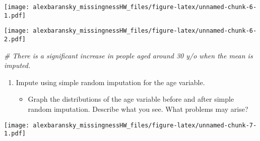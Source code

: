 \documentclass[]{article}
\newenvironment{Shaded}{\begin{snugshade}}{\end{snugshade}}
\newcommand{\KeywordTok}[1]{\textcolor[rgb]{0.13,0.29,0.53}{\textbf{#1}}}
\newcommand{\DecValTok}[1]{\textcolor[rgb]{0.00,0.00,0.81}{#1}}
\newcommand{\StringTok}[1]{\textcolor[rgb]{0.31,0.60,0.02}{#1}}
\newcommand{\CommentTok}[1]{\textcolor[rgb]{0.56,0.35,0.01}{\textit{#1}}}
\newcommand{\OperatorTok}[1]{\textcolor[rgb]{0.81,0.36,0.00}{\textbf{#1}}}
\newcommand{\NormalTok}[1]{#1}
\providecommand{\tightlist}{%
  \setlength{\itemsep}{0pt}\setlength{\parskip}{0pt}}
\begin{document}
\texttt{[image: alexbaransky\_missingnessHW\_files/figure-latex/unnamed-chunk-6-1.pdf]}

\begin{Shaded}
\end{Shaded}

\texttt{[image: alexbaransky\_missingnessHW\_files/figure-latex/unnamed-chunk-6-2.pdf]}

\begin{Shaded}
\begin{Highlighting}[]
\CommentTok{# There is a significant increase in people aged around 30 y/o when the mean is imputed.}
\end{Highlighting}
\end{Shaded}

\begin{enumerate}
\def\labelenumi{\arabic{enumi}.}
\setcounter{enumi}{6}
\tightlist
\item
  Impute using simple random imputation for the age variable.

  \begin{itemize}
  \tightlist
  \item
    Graph the distributions of the age variable before and after simple
    random imputation. Describe what you see. What problems may arise?
  \end{itemize}
\end{enumerate}

\begin{Shaded}
\end{Shaded}

\texttt{[image: alexbaransky\_missingnessHW\_files/figure-latex/unnamed-chunk-7-1.pdf]}

\begin{Shaded}
\end{Shaded}
\end{document}
